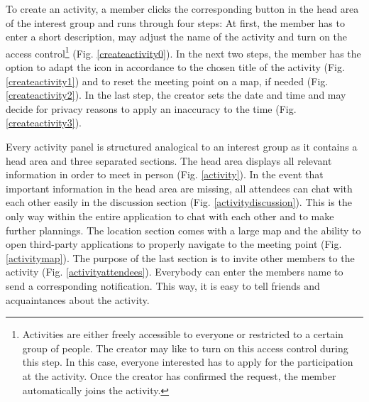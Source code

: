 \documentclass[12pt,numbers=noenddot,parskip,bibliography=totocnumbered,listof=totocnumbered,draft]{scrreprt}
\begin{document}
To create an activity, a member clicks the corresponding button in the head area of the interest group and runs through four steps: At first, the member has to enter a short description, may adjust the name of the activity and turn on the access control\footnote{Activities are either freely accessible to everyone or restricted to a certain group of people. The creator may like to turn on this access control during this step. In this case, everyone interested has to apply for the participation at the activity. Once the creator has confirmed the request, the member automatically joins the activity.} (Fig. \ref{createactivity0}). In the next two steps, the member has the option to adapt the icon in accordance to the chosen title of the activity (Fig. \ref{createactivity1}) and to reset the meeting point on a map, if needed (Fig. \ref{createactivity2}). In the last step, the creator sets the date and time and may decide for privacy reasons to apply an inaccuracy to the time (Fig. \ref{createactivity3}).

Every activity panel is structured analogical to an interest group as it contains a head area and three separated sections. The head area displays all relevant information in order to meet in person (Fig. \ref{activity}). In the event that important information in the head area are missing, all attendees can chat with each other easily in the discussion section (Fig. \ref{activitydiscussion}). This is the only way within the entire application to chat with each other and to make further plannings. The location section comes with a large map and the ability to open third-party applications to properly navigate to the meeting point (Fig. \ref{activitymap}). The purpose of the last section is to invite other members to the activity (Fig. \ref{activityattendees}). Everybody can enter the members name to send a corresponding notification. This way, it is easy to tell friends and acquaintances about the activity.
\end{document}
